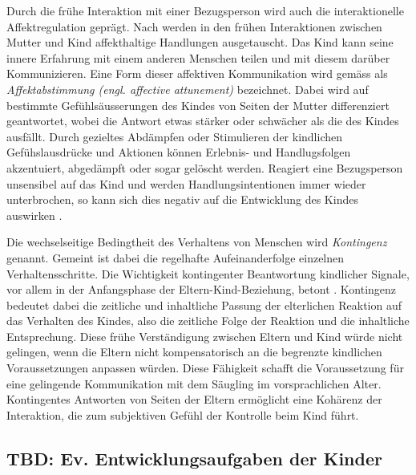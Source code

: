 Durch die frühe Interaktion mit einer Bezugsperson wird auch die interaktionelle Affektregulation geprägt. Nach  werden in den frühen Interaktionen zwischen Mutter und Kind affekthaltige Handlungen ausgetauscht. Das Kind kann seine innere Erfahrung mit einem anderen Menschen teilen und mit diesem darüber Kommunizieren. Eine Form dieser affektiven Kommunikation wird gemäss  als \textit{Affektabstimmung (engl. affective attunement)} bezeichnet. Dabei wird auf bestimmte Gefühlsäusserungen des Kindes von Seiten der Mutter differenziert geantwortet, wobei die Antwort etwas stärker oder schwächer als die des Kindes ausfällt. Durch gezieltes Abdämpfen oder Stimulieren der kindlichen Gefühslausdrücke und Aktionen können Erlebnis- und Handlugsfolgen akzentuiert, abgedämpft oder sogar gelöscht werden. Reagiert eine Bezugsperson unsensibel auf das Kind und werden Handlungsintentionen immer wieder unterbrochen, so kann sich dies negativ auf die Entwicklung des Kindes auswirken \cite{Resch1999}.


Die wechselseitige Bedingtheit des Verhaltens von Menschen wird \textit{Kontingenz} genannt. Gemeint ist dabei die regelhafte Aufeinanderfolge einzelnen Verhaltensschritte. Die Wichtigkeit kontingenter Beantwortung kindlicher Signale, vor allem in der Anfangsphase der Eltern-Kind-Beziehung, betont . Kontingenz bedeutet dabei die zeitliche und inhaltliche Passung der elterlichen Reaktion auf das Verhalten des Kindes, also die zeitliche Folge der Reaktion und die inhaltliche Entsprechung. Diese frühe Verständigung zwischen Eltern und Kind würde nicht gelingen, wenn die Eltern nicht kompensatorisch an die begrenzte kindlichen Voraussetzungen anpassen würden. Diese Fähigkeit schafft die Voraussetzung für eine gelingende Kommunikation mit dem Säugling im vorsprachlichen Alter. Kontingentes Antworten von Seiten der Eltern ermöglicht eine Kohärenz der Interaktion, die zum subjektiven Gefühl der Kontrolle beim Kind führt.


\subsection{TBD: Ev. Entwicklungsaufgaben der Kinder} \label{sec:Entwicklungsaufgaben}

